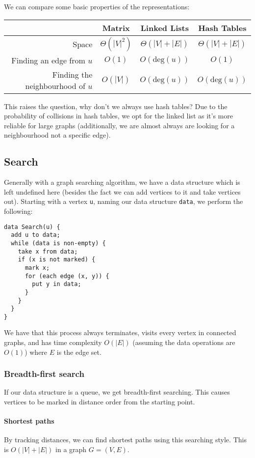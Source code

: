 \documentclass[a4paper, 12pt, twoside]{article}
\begin{document}
We can compare some basic properties of the representations:
\begin{center}
  \renewcommand{\arraystretch}{1.4}
  \begin{tabular}{ | r || c | c | c |}
    \hline
    & Matrix & Linked Lists & Hash Tables \\ 
    \hline\hline
    Space & $\Theta(|V|^2)$ & $\Theta(|V| + |E|)$ & $\Theta(|V| + |E|)$ \\
    Finding an edge from $u$ & $O(1)$ & $O(\text{deg}(u))$ & $O(1)$ \\
    Finding the neighbourhood of $u$ & $O(|V|)$ & $O(\text{deg}(u))$ & $O(\text{deg}(u))$ \\
    \hline
  \end{tabular}
\end{center} This raises the question, why don't we always use
hash tables? Due to the probability of collisions in hash tables,
we opt for the linked list as it's more reliable for large graphs
(additionally, we are almost always are looking for a neighbourhood
not a specific edge).

\subsection{Search}

Generally with a graph searching algorithm, we have a data structure 
which is left undefined here (besides the fact we can add vertices to 
it and take vertices out). Starting with a vertex \texttt{u}, naming 
our data structure \texttt{data}, we perform the following:
\begin{lstlisting}
data Search(u) {
  add u to data;
  while (data is non-empty) {
    take x from data;
    if (x is not marked) {
      mark x;
      for (each edge (x, y)) {
        put y in data;
      }
    }
  }
}
\end{lstlisting} We have that this process always terminates, visits
every vertex in connected graphs, and has time complexity $O(|E|)$
(assuming the data operations are $O(1)$) where $E$ is the edge set.

\subsubsection{Breadth-first search}

If our data structure is a queue, we get breadth-first searching.
This causes vertices to be marked in distance order from the starting
point.
\paragraph{Shortest paths} By tracking distances, we can find shortest
paths using this searching style.
This is $O(|V| + |E|)$ in a graph $G = (V, E)$.
\end{document}
